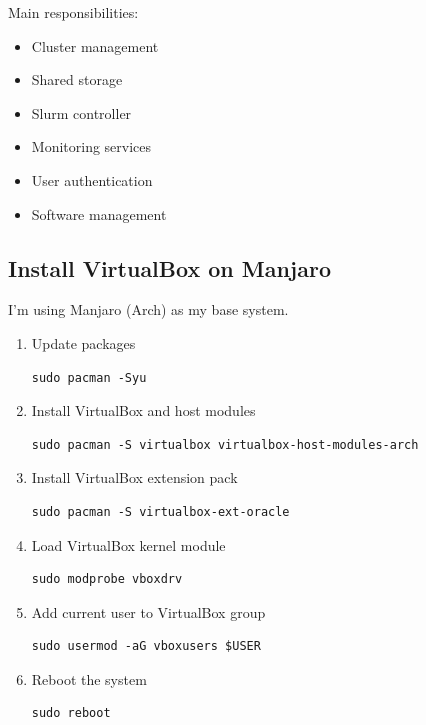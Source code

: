 \documentclass[11pt]{article}
\begin{document}
Main responsibilities:

\begin{itemize}
\item Cluster management
\item Shared storage
\item Slurm controller
\item Monitoring services
\item User authentication
\item Software management
\end{itemize}
\subsection{Install VirtualBox on Manjaro}
\label{sec:org984d7dc}

I'm using Manjaro (Arch) as my base system.
\begin{enumerate}
\item Update packages
\label{sec:org9056ba8}

\begin{verbatim}
sudo pacman -Syu
\end{verbatim}
\item Install VirtualBox and host modules
\label{sec:orgeb48319}

\begin{verbatim}
sudo pacman -S virtualbox virtualbox-host-modules-arch
\end{verbatim}
\item Install VirtualBox extension pack
\label{sec:orgedf2e2b}

\begin{verbatim}
sudo pacman -S virtualbox-ext-oracle
\end{verbatim}
\item Load VirtualBox kernel module
\label{sec:org1da2e1c}

\begin{verbatim}
sudo modprobe vboxdrv
\end{verbatim}
\item Add current user to VirtualBox group
\label{sec:orgeb9f844}

\begin{verbatim}
sudo usermod -aG vboxusers $USER
\end{verbatim}
\item Reboot the system
\label{sec:orgbc0ae24}

\begin{verbatim}
sudo reboot
\end{verbatim}
\end{enumerate}
\end{document}
